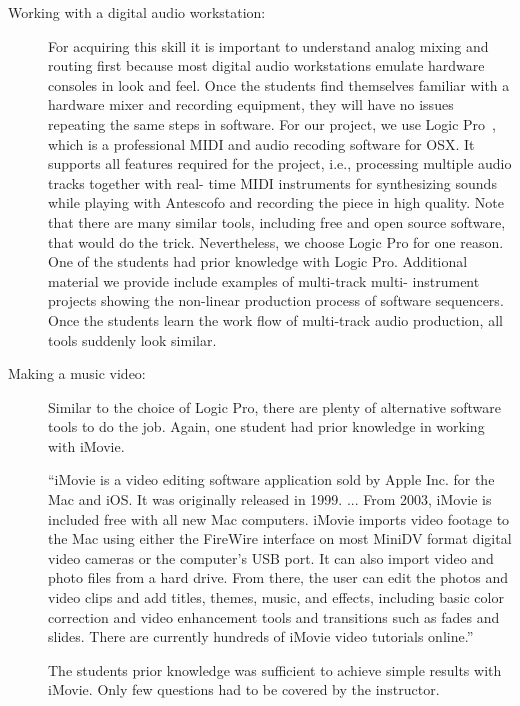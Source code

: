 \documentclass[onecolumn,nocopyrightspace,preprint]{sigplanconf}
\begin{document}
\begin{description}
\item[Working with a digital audio workstation:] For acquiring this skill it
is important to understand analog mixing and routing first because most
digital audio workstations emulate hardware consoles in look and feel. Once
the students find themselves familiar with a hardware mixer and recording
equipment, they will have no issues repeating the same steps in software. For
our project, we use Logic Pro~\cite{website:logic}, which is a professional
MIDI and audio recoding software for OSX. It supports all features required
for the project, i.e., processing multiple audio tracks together with real-
time MIDI instruments for synthesizing sounds while playing with Antescofo and
recording the piece in high quality.  Note that there are many similar tools,
including free and open source software, that would do the trick.
Nevertheless, we choose Logic Pro for one reason. One of the students had
prior knowledge with Logic Pro. Additional material we provide include
examples of multi-track multi- instrument projects showing the non-linear
production process of software sequencers. Once the students learn the work
flow of multi-track audio production, all tools suddenly look similar.

\item[Making a music video:] Similar to the choice of Logic Pro, there are
plenty of alternative software tools to do the job. Again, one student had
prior knowledge in working with iMovie.

``iMovie is a video editing software application sold by Apple Inc. for the Mac
and iOS. It was originally released in 1999. ... From 2003, iMovie is included
free with all new Mac computers. iMovie imports video footage to the Mac using
either the FireWire interface on most MiniDV format digital video cameras or
the computer's USB port. It can also import video and photo files from a hard
drive. From there, the user can edit the photos and video clips and add
titles, themes, music, and effects, including basic color correction and video
enhancement tools and transitions such as fades and slides. There are
currently hundreds of iMovie video tutorials online.''~\cite{website:imovie}

The students prior knowledge was sufficient to achieve simple results with
iMovie. Only few questions had to be covered by the instructor.

\end{description}
\end{document}
